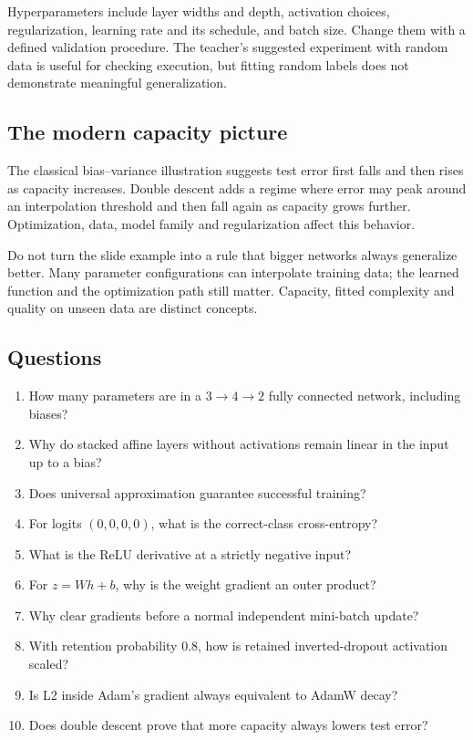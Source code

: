 \documentclass[11pt]{article}
\begin{document}
Hyperparameters include layer widths and depth, activation choices, regularization, learning rate and its schedule, and batch size. Change them with a defined validation procedure. The teacher's suggested experiment with random data is useful for checking execution, but fitting random labels does not demonstrate meaningful generalization.
\subsection{The modern capacity picture}
The classical bias--variance illustration suggests test error first falls and then rises as capacity increases. Double descent adds a regime where error may peak around an interpolation threshold and then fall again as capacity grows further. Optimization, data, model family and regularization affect this behavior.

Do not turn the slide example into a rule that bigger networks always generalize better. Many parameter configurations can interpolate training data; the learned function and the optimization path still matter. Capacity, fitted complexity and quality on unseen data are distinct concepts.
\subsection{Questions}
\begin{enumerate}
\item How many parameters are in a $3\to4\to2$ fully connected network, including biases?
\item Why do stacked affine layers without activations remain linear in the input up to a bias?
\item Does universal approximation guarantee successful training?
\item For logits $(0,0,0,0)$, what is the correct-class cross-entropy?
\item What is the ReLU derivative at a strictly negative input?
\item For $z=Wh+b$, why is the weight gradient an outer product?
\item Why clear gradients before a normal independent mini-batch update?
\item With retention probability $0.8$, how is retained inverted-dropout activation scaled?
\item Is L2 inside Adam's gradient always equivalent to AdamW decay?
\item Does double descent prove that more capacity always lowers test error?
\end{enumerate}
\end{document}

